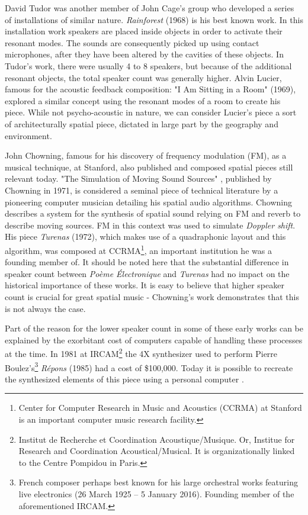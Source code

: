 David Tudor was another member of John Cage's group who developed a series of installations of similar nature. \textit{Rainforest} (1968) is his best known work. In this installation work speakers are placed inside objects in order to activate their resonant modes. The sounds are consequently picked up using contact microphones, after they have been altered by the cavities of these objects. In Tudor's work, there were usually 4 to 8 speakers, but because of the additional resonant objects, the total speaker count was generally higher. Alvin Lucier, famous for the acoustic feedback composition: "I Am Sitting in a Room" (1969), explored a similar concept using the resonant modes of a room to create his piece. While not psycho-acoustic in nature, we can consider Lucier's piece a sort of architecturally spatial piece, dictated in large part by the geography and environment.

John Chowning, famous for his discovery of frequency modulation (FM), as a musical technique, at Stanford, also published and composed spatial pieces still relevant today. "The Simulation of Moving Sound Sources" \cite{chowning1971simulation}, published by Chowning in 1971, is considered a seminal piece of technical literature by a pioneering computer musician detailing his spatial audio algorithms. Chowning describes a system for the synthesis of spatial sound relying on FM and reverb to describe moving sources. FM in this context was used to simulate \textit{Doppler shift}. His piece \textit{Turenas} (1972), which makes use of a quadraphonic layout and this algorithm, was composed at CCRMA\footnote{Center for Computer Research in Music and Acoustics (CCRMA) at Stanford is an important computer music research facility.}, an important institution he was a founding member of. It should be noted here that the substantial difference in speaker count between \textit{Poème Électronique} and \textit{Turenas} had no impact on the historical importance of these works. It is easy to believe that higher speaker count is crucial for great spatial music - Chowning's work demonstrates that this is not always the case.

Part of the reason for the lower speaker count in some of these early works can be explained by the exorbitant cost of computers capable of handling these processes at the time. In 1981 at IRCAM\footnote{Institut de Recherche et Coordination Acoustique/Musique. Or, Institue for Research and Coordination Acoustical/Musical. It is organizationally linked to the Centre Pompidou in Paris.} the 4X synthesizer used to perform Pierre Boulez's\footnote{French composer perhaps best known for his large orchestral works featuring live electronics (26 March 1925 – 5 January 2016). Founding member of the aforementioned IRCAM.} \textit{Répons} (1985) had a cost of \$100,000. Today it is possible to recreate the synthesized elements of this piece using a personal computer \cite{zvonar2000extremely}. 


